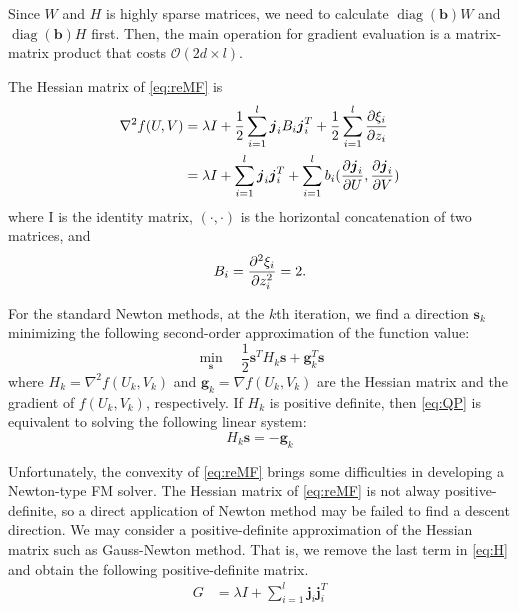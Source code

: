 \documentclass[11pt,twoside]{article}
\newcommand{\bsym}[1]{\ensuremath{\boldsymbol{#1}}}
\newcommand{\bw}{\ensuremath{\bsym{w}}}
\newcommand{\bj}{\ensuremath{\bsym{j}}}
\newcommand{\bp}{\ensuremath{\bsym{p}}}
\newcommand{\bq}{\ensuremath{\bsym{q}}}
\newcommand{\bh}{\ensuremath{\bsym{h}}}
\newcommand{\bs}{\ensuremath{\bsym{s}}}
\newcommand{\bg}{\ensuremath{\bsym{g}}}
\newcommand{\bbO}[1]{\ensuremath{\mathcal{O}\left(#1\right)}}
\DeclareMathOperator*{\diag}{diag}
\begin{document}
Since $W$ and $H$ is highly sparse matrices, we need to calculate $\diag(\bsym{b})W$ and $\diag(\bsym{b})H$ first.
Then, the main operation for gradient evaluation is a matrix-matrix product that costs $\bbO{2d\times l}$.
\par

The Hessian matrix of \eqref{eq:reMF} is 
\begin{align}    
        \nabla^2 f(U, V) &= \lambda I + \frac{1}{2}\sum_{i=1}^{l}\bj_i B_i \bj_i^T 
                     + \frac{1}{2}\sum_{i=1}^l \pdv{\xi_i}{z_i} (\frac{\partial \bj_i}{\partial U}, \frac{\partial \bj_i}{\partial V})\nonumber \\
        &= \lambda I + \sum_{i=1}^{l}\bj_i\bj_i^T + \sum_{i=1}^l b_i (\frac{\partial \bj_i}{\partial U}, \frac{\partial \bj_i}{\partial V})
    \label{eq:H}    
\end{align}
where I is the identity matrix, $(\cdot,\cdot)$ is the horizontal concatenation of two matrices, and
\begin{equation}
    B_i = \pdv[2]{\xi_i}{z_i} = 2
    \label{eq:B_i}.
\end{equation}


For the standard Newton methods, at the $k$th iteration, we find a direction $\bs_k$ minimizing the following second-order approximation of the function value:
\begin{equation}
    \min_{\bs} \quad \frac{1}{2}\bs^T H_k \bs + \bg_k^T \bs
\label{eq:QP}
\end{equation}
where $H_k = \nabla^2 f(U_k, V_k)$ and $\bg_k = \nabla f(U_k, V_k)$ are the Hessian matrix and the gradient of $f(U_k, V_k)$, respectively.
If $H_k$ is positive definite, then \eqref{eq:QP} is equivalent to solving the following linear system:
\begin{equation}
    H_k\bs = -\bg_k
\label{eq:HLE}
\end{equation}

Unfortunately, the convexity of \eqref{eq:reMF} brings some difficulties in developing a Newton-type FM solver.
The Hessian matrix of \eqref{eq:reMF}  is not alway positive-definite, so a direct application of Newton method may be failed to find a descent direction.
We may consider a positive-definite approximation of the Hessian matrix such as Gauss-Newton method. 
That is, we remove the last term in \eqref{eq:H} and obtain the following positive-definite matrix.
\begin{equation}
    \begin{aligned}
    G &= \lambda I + \sum_{i=1}^{l}\bj_i\bj_i^T
    \label{eq:G}
    \end{aligned}
\end{equation}
\end{document}
